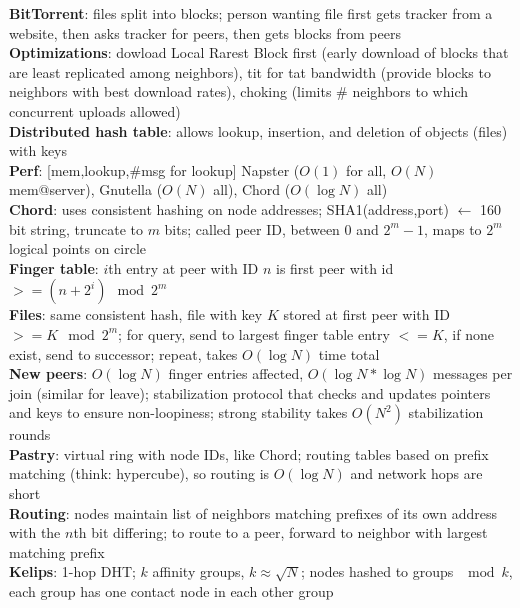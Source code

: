 \documentclass{article}
\begin{document}
\begin{multicols*}{3}
\textbf{BitTorrent}: files split into blocks; person wanting file first gets tracker from a website, then asks tracker for peers, then gets blocks from peers \\
\textbf{Optimizations}: dowload Local Rarest Block first (early download of blocks that are least replicated among neighbors), tit for tat bandwidth (provide blocks to neighbors with best download rates), choking (limits \# neighbors to which concurrent uploads allowed) \\
\textbf{Distributed hash table}: allows lookup, insertion, and deletion of objects (files) with keys \\
\textbf{Perf}: [mem,lookup,\#msg for lookup] Napster ($O(1)$ for all, $O(N)$ mem@server), Gnutella ($O(N)$ all), Chord ($O(\log N)$ all) \\
\textbf{Chord}: uses consistent hashing on node addresses; SHA1(address,port) $\leftarrow$ 160 bit string, truncate to $m$ bits; called peer ID, between 0 and $2^m - 1$, maps to $2^m$ logical points on circle \\
\textbf{Finger table}: $i$th entry at peer with ID $n$ is first peer with id $>= (n+2^i)\mod 2^m$ \\
\textbf{Files}: same consistent hash, file with key $K$ stored at first peer with ID $>= K \mod 2^m$; for query, send to largest finger table entry $<= K$, if none exist, send to successor; repeat, takes $O(\log N)$ time total \\
\textbf{New peers}: $O(\log N)$ finger entries affected, $O(\log N * \log N)$ messages per join (similar for leave); stabilization protocol that checks and updates pointers and keys to ensure non-loopiness; strong stability takes $O(N^2)$ stabilization rounds \\
\textbf{Pastry}: virtual ring with node IDs, like Chord; routing tables based on prefix matching (think: hypercube), so routing is $O(\log N)$ and network hops are short \\
\textbf{Routing}: nodes maintain list of neighbors matching prefixes of its own address with the $n$th bit differing; to route to a peer, forward to neighbor with largest matching prefix \\
\textbf{Kelips}: 1-hop DHT; $k$ affinity groups, $k \approx \sqrt{N}$; nodes hashed to groups $\mod k$, each group has one contact node in each other group


\end{multicols*}
\end{document}
